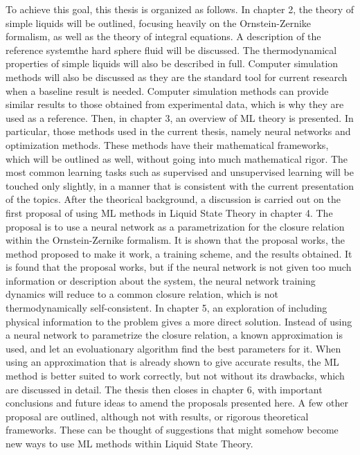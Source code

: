 To achieve this goal, this thesis is organized as follows. In chapter 2, 
the theory of simple liquids will be outlined, focusing heavily on the Ornstein-Zernike
formalism, as well as the theory of integral equations.
A description of the reference system\textemdash the hard sphere fluid\textemdash 
will be discussed. The thermodynamical properties of simple liquids will also be described 
in full. Computer simulation methods will also be discussed as they are the standard tool 
for current research when a baseline result is needed. Computer simulation methods can 
provide similar results to those obtained from experimental data, which is why they are 
used as a reference.
Then, in chapter 3, an overview of ML theory is presented.
In particular, those methods used in the current thesis, namely neural networks and
optimization methods. These methods have their mathematical frameworks, which will be
outlined as well, without going into much mathematical rigor.
The most common learning tasks such as supervised and unsupervised learning will be
touched only slightly, in a manner that is consistent with the current presentation
of the topics.
After the theorical background, a discussion is carried out on the first proposal of using 
ML methods in Liquid State Theory in chapter 4.
The proposal is to use a neural network as a 
parametrization for the closure relation within the Ornstein-Zernike formalism.
It is shown that the proposal works, the method proposed to make it work, a training
scheme, and the results obtained. It is found that the proposal works, but if the neural
network is not given too much information or description about the system, the neural
network training dynamics will reduce to a common closure relation, which is not
thermodynamically self-consistent.
In chapter 5, an exploration of including physical information to the problem gives
a more direct solution. Instead of using a neural network to parametrize the closure
relation, a known approximation is used, and let an evoluationary algorithm find the
best parameters for it. When using an approximation that is already shown to give
accurate results, the ML method is better suited to work correctly, but not without
its drawbacks, which are discussed in detail.
The thesis then closes in chapter 6, with important conclusions and future ideas
to amend the proposals presented here. A few other proposal are outlined, although
not with results, or rigorous theoretical frameworks. These can be thought of
suggestions that might somehow become new ways to use ML methods within Liquid
State Theory.